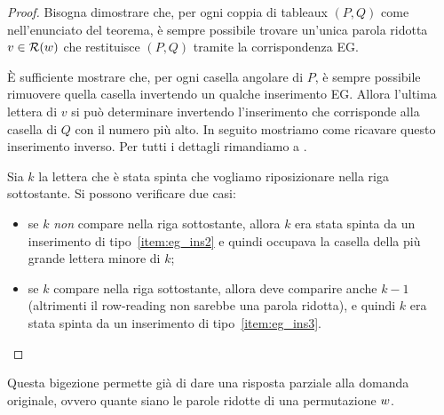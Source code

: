 \begin{proof}
    Bisogna dimostrare che, per ogni coppia di tableaux $(P,Q)$ come nell'enunciato
    del teorema,
    \`e sempre possibile trovare un'unica parola ridotta $v\in \operatorname{\mathcal{R}}(w)$ che restituisce
    $(P,Q)$ tramite la corrispondenza EG.


    \`E sufficiente mostrare che, per ogni casella angolare di $P$, \`e sempre possibile
    rimuovere quella casella invertendo un qualche inserimento EG.
    Allora l'ultima lettera di $v$ si pu\`o determinare invertendo l'inserimento
    che corrisponde alla casella di $Q$ con il numero pi\`u alto.
    In seguito mostriamo come ricavare  questo inserimento inverso.
    Per tutti i dettagli rimandiamo a \cite[Theorem~6.25]{edelman-greene-87}.

    Sia $k$ la lettera che \`e stata spinta che vogliamo riposizionare nella riga
    sottostante. 
    Si possono verificare due casi:
    \begin{itemize}
        \item se $k$ \emph{non} compare nella riga sottostante, allora $k$ era stata 
            spinta da un inserimento di tipo~\ref{item:eg_ins2} e quindi occupava la 
            casella della pi\`u grande lettera minore di $k$;
        \item se $k$ compare nella riga sottostante, allora deve comparire anche $k-1$
            (altrimenti il row-reading non sarebbe una parola ridotta), e quindi
            $k$ era stata spinta da un inserimento di tipo~\ref{item:eg_ins3}.
        \qedhere
    \end{itemize}
\end{proof}

    
Questa bigezione permette gi\`a di dare una risposta parziale alla domanda originale,
ovvero quante siano le parole ridotte di una permutazione $w$.

